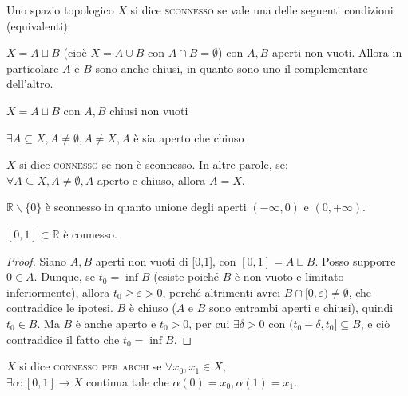 \begin{defn}
Uno spazio topologico $X$ si dice \textsc{sconnesso} se vale una delle seguenti condizioni (equivalenti):
\begin{nlist}
\item $X=A \sqcup B$ (cioè $X=A \cup B$ con $A \cap B = \emptyset$) con $A,B$ aperti non vuoti. Allora in particolare $A$ e $B$ sono anche chiusi, in quanto sono uno il complementare dell'altro.
\item $X=A \sqcup B$ con $A,B$ chiusi non vuoti
\item $\exists A \subseteq X, A \neq \emptyset, A \neq X, A$ è sia aperto che chiuso
\end{nlist}
\end{defn}

\begin{defn}
$X$ si dice \textsc{connesso} se non è sconnesso. In altre parole, se: \\ $\forall A \subseteq X, A \neq \emptyset, A$ aperto e chiuso, allora $A=X$.
\end{defn}

\begin{ex}
$\mathbb{R} \smallsetminus \{0\}$ è sconnesso in quanto unione degli aperti $(-\infty,0)$ e $(0,+\infty)$.
\end{ex}

\begin{thm}
$[0,1] \subset \mathbb{R}$ è connesso.
\end{thm}
\begin{proof}
Siano $A,B$ aperti non vuoti di [0,1], con $[0,1]=A \sqcup B$. Posso supporre $0 \in A$. Dunque, se $t_0=\inf B$ (esiste poiché $B$ è non vuoto e limitato inferiormente), allora $t_0 \ge \varepsilon >0$, perché altrimenti avrei $B \cap [0,\varepsilon) \neq \emptyset$, che contraddice le ipotesi. $B$ è chiuso ($A$ e $B$ sono entrambi aperti e chiusi), quindi $t_0 \in B$. Ma $B$ è anche aperto e $t_0 >0$, per cui $\exists \delta >0$ con $(t_0-\delta, t_0] \subseteq B$, e ciò contraddice il fatto che $t_0=\inf B$.
\end{proof}

\begin{defn}
$X$ si dice \textsc{connesso per archi} se $\forall x_0,x_1 \in X$, \\
$\exists \alpha:[0,1] \longrightarrow X$ continua tale che $\alpha (0)=x_0, \alpha (1)=x_1$.
\end{defn}